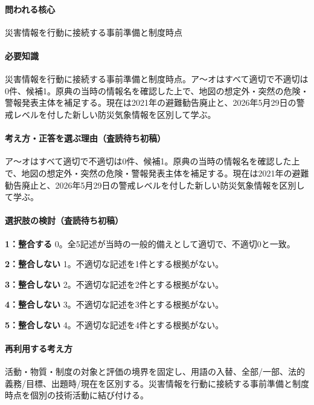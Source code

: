 \paragraph{問われる核心} 災害情報を行動に接続する事前準備と制度時点

\paragraph{必要知識} 災害情報を行動に接続する事前準備と制度時点。ア〜オはすべて適切で不適切は0件、候補1。原典の当時の情報名を確認した上で、地図の想定外・突然の危険・警報発表主体を補足する。現在は2021年の避難勧告廃止と、2026年5月29日の警戒レベルを付した新しい防災気象情報を区別して学ぶ。

\paragraph{考え方・正答を選ぶ理由（査読待ち初稿）} ア〜オはすべて適切で不適切は0件、候補1。原典の当時の情報名を確認した上で、地図の想定外・突然の危険・警報発表主体を補足する。現在は2021年の避難勧告廃止と、2026年5月29日の警戒レベルを付した新しい防災気象情報を区別して学ぶ。

\paragraph{選択肢の検討（査読待ち初稿）}\mbox{}\par

\noindent\textbf{1：整合する} 0。全5記述が当時の一般的備えとして適切で、不適切0と一致。\par

\noindent\textbf{2：整合しない} 1。不適切な記述を1件とする根拠がない。\par

\noindent\textbf{3：整合しない} 2。不適切な記述を2件とする根拠がない。\par

\noindent\textbf{4：整合しない} 3。不適切な記述を3件とする根拠がない。\par

\noindent\textbf{5：整合しない} 4。不適切な記述を4件とする根拠がない。\par

\paragraph{再利用する考え方} 活動・物質・制度の対象と評価の境界を固定し、用語の入替、全部/一部、法的義務/目標、出題時/現在を区別する。災害情報を行動に接続する事前準備と制度時点を個別の技術活動に結び付ける。

